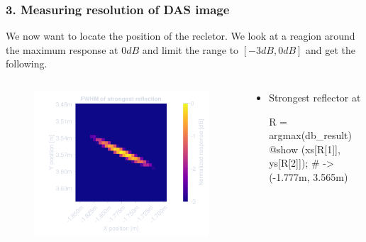 \documentclass[compress,aspectratio=169]{beamer}
\begin{document}
\begin{frame}[fragile] %
    \frametitle{3. Measuring resolution of DAS image}
    We now want to locate the position of the recletor.
    We look at a reagion around the maximum response at $0dB$ and limit the range
    to $[-3dB, 0dB]$ and get the following.
    \begin{columns}
        \begin{column}{0.5\textwidth}
            \begin{figure}
                \includegraphics[width=\columnwidth]{"../5.pdf"}
            \end{figure}
        \end{column}
        \begin{column}{0.5\textwidth}
            \begin{itemize}
                \item Strongest reflector at
                    \begin{jllisting}[gobble=24]
                        R = argmax(db_result)
                        @show (xs[R[1]], ys[R[2]]); 
                        # -> (-1.777m, 3.565m)
                    \end{jllisting}
            \end{itemize}
        \end{column}
    \end{columns}
\end{frame} 
\end{document}

